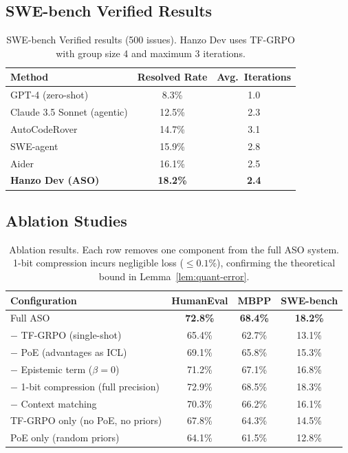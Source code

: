 \documentclass[11pt]{article}
\begin{document}
\subsection{SWE-bench Verified Results}

\begin{table}[h]
\centering
\begin{tabular}{lcc}
\toprule
Method & Resolved Rate & Avg.\ Iterations \\
\midrule
GPT-4 (zero-shot) & 8.3\% & 1.0 \\
Claude 3.5 Sonnet (agentic) & 12.5\% & 2.3 \\
AutoCodeRover~\cite{zhang2024autocoderover} & 14.7\% & 3.1 \\
SWE-agent~\cite{yang2024sweagent} & 15.9\% & 2.8 \\
Aider~\cite{aider2024} & 16.1\% & 2.5 \\
\textbf{Hanzo Dev (ASO)} & \textbf{18.2\%} & \textbf{2.4} \\
\bottomrule
\end{tabular}
\caption{SWE-bench Verified results (500 issues). Hanzo Dev uses TF-GRPO with
group size 4 and maximum 3 iterations.}
\label{tab:swebench}
\end{table}

\subsection{Ablation Studies}

\begin{table}[h]
\centering
\begin{tabular}{lccc}
\toprule
Configuration & HumanEval & MBPP & SWE-bench \\
\midrule
Full ASO & \textbf{72.8\%} & \textbf{68.4\%} & \textbf{18.2\%} \\
\midrule
$-$ TF-GRPO (single-shot) & 65.4\% & 62.7\% & 13.1\% \\
$-$ PoE (advantages as ICL) & 69.1\% & 65.8\% & 15.3\% \\
$-$ Epistemic term ($\beta = 0$) & 71.2\% & 67.1\% & 16.8\% \\
$-$ 1-bit compression (full precision) & 72.9\% & 68.5\% & 18.3\% \\
$-$ Context matching & 70.3\% & 66.2\% & 16.1\% \\
\midrule
TF-GRPO only (no PoE, no priors) & 67.8\% & 64.3\% & 14.5\% \\
PoE only (random priors) & 64.1\% & 61.5\% & 12.8\% \\
\bottomrule
\end{tabular}
\caption{Ablation results. Each row removes one component from the full ASO
system. 1-bit compression incurs negligible loss ($\leq 0.1\%$), confirming
the theoretical bound in Lemma~\ref{lem:quant-error}.}
\label{tab:ablation}
\end{table}
\end{document}
